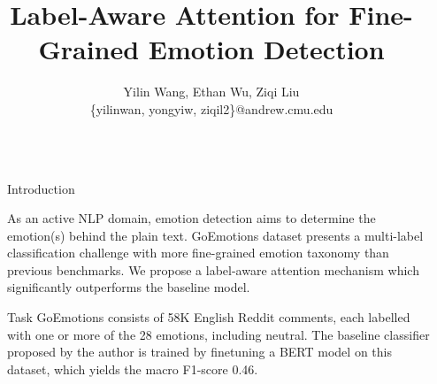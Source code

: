 \documentclass[final,20pt]{beamer}
\title{Label-Aware Attention for Fine-Grained Emotion Detection}
\author{Yilin Wang, Ethan Wu, Ziqi Liu \\
\{yilinwan, yongyiw, ziqil2\}@andrew.cmu.edu}
\institute{Carnegie Mellon University}
\newlength{\sepwid}
\newlength{\onecolwid}
\begin{document}

\setlength{\belowcaptionskip}{1ex} %
\setlength\belowdisplayshortskip{1ex} %

\begin{frame}[t] %

\begin{columns}[t] %









\begin{column}{\sepwid}\end{column} %


\begin{column}{\onecolwid} %



\vspace*{-0.5in}

\begin{block}{Introduction}



As an active NLP domain, emotion detection aims to determine the emotion(s) behind the plain text. GoEmotions dataset presents a multi-label classification challenge with more fine-grained emotion taxonomy than previous benchmarks. We propose a label-aware attention mechanism which significantly outperforms the baseline model. 

\end{block}


\begin{block}{Task}
GoEmotions consists of 58K English Reddit comments, each labelled with one or more of the 28 emotions, including neutral. The baseline classifier proposed by the author is trained by finetuning a BERT model on this dataset, which yields the macro F1-score 0.46. 


\end{block}
\end{column}
\end{columns}
\end{frame}
\end{document}
